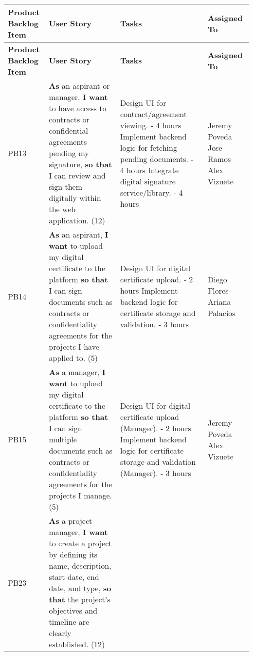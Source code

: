 \documentclass{scrreprt}
\begin{document}
\begin{longtable}{|p{1.5cm}|p{5.5cm}|p{4.5cm}|p{3cm}|} \hline
	\textbf{Product Backlog Item} & \textbf{User Story} & \textbf{Tasks} & \textbf{Assigned To} \\ \hline
	\endfirsthead
	\hline
	\textbf{Product Backlog Item} & \textbf{User Story} & \textbf{Tasks} & \textbf{Assigned To} \\ \hline
	\endhead
	
	PB13 & \textbf{As} an aspirant or manager, \textbf{I want} to have access to contracts or confidential agreements pending my signature, \textbf{so that} I can review and sign them digitally within the web application. (12) &
	
	Design UI for contract/agreement viewing. - 4 hours \newline
	Implement backend logic for fetching pending documents. - 4 hours \newline
	Integrate digital signature service/library. - 4 hours &
	Jeremy Poveda \newline
	Jose Ramos \newline
	Alex Vizuete \\ \hline
	
	PB14 & \textbf{As} an aspirant, \textbf{I want} to upload my digital certificate to the platform \textbf{so that} I can sign documents such as contracts or confidentiality agreements for the projects I have applied to. (5) &
	
	Design UI for digital certificate upload. - 2 hours \newline
	Implement backend logic for certificate storage and validation. - 3 hours &
	Diego Flores \newline
	Ariana Palacios \\ \hline
	
	PB15 & \textbf{As} a manager, \textbf{I want} to upload my digital certificate to the platform \textbf{so that} I can sign multiple documents such as contracts or confidentiality agreements for the projects I manage. (5) &
	
	Design UI for digital certificate upload (Manager). - 2 hours \newline
	Implement backend logic for certificate storage and validation (Manager). - 3 hours &
	Jeremy Poveda \newline
	Alex Vizuete \\ \hline
	
	PB23 & \textbf{As} a project manager, \textbf{I want} to create a project by defining its name, description, start date, end date, and type, \textbf{so that} the project's objectives and timeline are clearly established. (12) &
	

\end{longtable}
\end{document}
